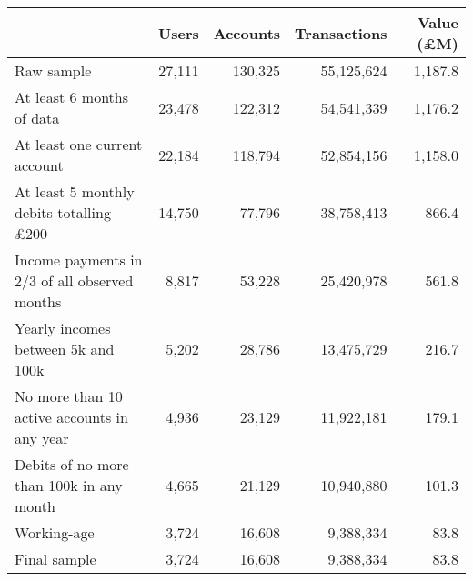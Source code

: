 \begin{tabular}{lrrrr}
\toprule
                                                        &   Users & Accounts & Transactions & Value (\pounds M) \\
\midrule
                                             Raw sample &  27,111 &  130,325 &   55,125,624 &           1,187.8 \\
                             At least 6 months of data &  23,478 &  122,312 &   54,541,339 &           1,176.2 \\
                          At least one current account &  22,184 &  118,794 &   52,854,156 &           1,158.0 \\
 At least 5 monthly debits totalling \pounds200 &  14,750 &   77,796 &   38,758,413 &             866.4 \\
         Income payments in 2/3 of all observed months &   8,817 &   53,228 &   25,420,978 &             561.8 \\
                    Yearly incomes between 5k and 100k &   5,202 &   28,786 &   13,475,729 &             216.7 \\
           No more than 10 active accounts in any year &   4,936 &   23,129 &   11,922,181 &             179.1 \\
              Debits of no more than 100k in any month &   4,665 &   21,129 &   10,940,880 &             101.3 \\
                                           Working-age &   3,724 &   16,608 &    9,388,334 &              83.8 \\
                                           Final sample &   3,724 &   16,608 &    9,388,334 &              83.8 \\
\bottomrule
\end{tabular}
